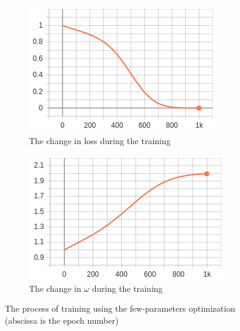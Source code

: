 \documentclass{article}
\begin{document}
\begin{figure}
	\centering
	\begin{subfigure}[b]{0.4\linewidth}
		\includegraphics[width=\linewidth]{few_param_loss.png}
		\caption{The change in loss during the training}
	\end{subfigure}
	\begin{subfigure}[b]{0.4\linewidth}
		\includegraphics[width=\linewidth]{few_param_omega.png}
		\caption{The change in $\omega$ during the training}
	\end{subfigure}
	\caption{The process of training using the few-parameters optimization (abscissa is the epoch number)}
	\label{fig:few_param}
\end{figure}
\end{document}
